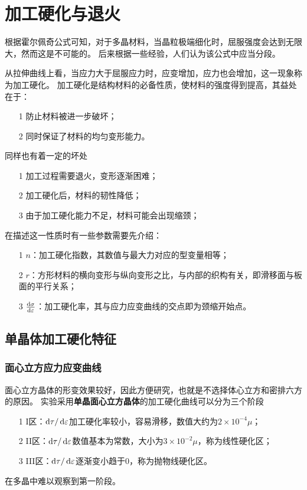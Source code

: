 \chapter{加工硬化与退火}
    根据霍尔佩奇公式可知，对于多晶材料，当晶粒极端细化时，屈服强度会达到无限大，然而这是不可能的。
    后来根据一些经验，人们认为该公式中应当分段。

    从拉伸曲线上看，当应力大于屈服应力时，应变增加，应力也会增加，这一现象称为加工硬化。
    加工硬化是结构材料的必备性质，使材料的强度得到提高，其益处在于：
    \begin{itemize}
        \item[1] 防止材料被进一步破坏；
        \item[2] 同时保证了材料的均匀变形能力。
    \end{itemize}
    同样也有着一定的坏处
    \begin{itemize}
        \item[1] 加工过程需要退火，变形逐渐困难；
        \item[2] 加工硬化后，材料的韧性降低；
        \item[3] 由于加工硬化能力不足，材料可能会出现缩颈；
    \end{itemize}
    在描述这一性质时有一些参数需要先介绍：
    \begin{itemize}
        \item[1] $n$：加工硬化指数，其数值与最大力对应的型变量相等；
        \item[2] $r$：方形材料的横向变形与纵向变形之比，与内部的织构有关，即滑移面与板面的平行关系；
        \item[3] $\frac{\mathop{}\!\mathrm{d} \sigma}{\mathop{}\!\mathrm{d} \varepsilon}$：加工硬化率，其与应力应变曲线的交点即为颈缩开始点。
    \end{itemize}
    \section{单晶体加工硬化特征}
        \subsection{面心立方应力应变曲线}
            面心立方晶体的形变效果较好，因此方便研究，也就是不选择体心立方和密排六方的原因。
            实验采用\textbf{单晶面心立方晶体}的加工硬化曲线可以分为三个阶段
            \begin{itemize}
                \item[1] I区：$\mathop{}\!\mathrm{d}\tau/\mathop{}\!\mathrm{d}\varepsilon$加工硬化率较小，容易滑移，数值大约为$2\times10^{-4}\mu$；
                \item[2] II区：$\mathop{}\!\mathrm{d}\tau/\mathop{}\!\mathrm{d}\varepsilon$数值基本为常数，大小为$3\times10^{-2}\mu$，称为线性硬化区；
                \item[3] III区：$\mathop{}\!\mathrm{d}\tau/\mathop{}\!\mathrm{d}\varepsilon$逐渐变小趋于0，称为抛物线硬化区。
            \end{itemize}
            在多晶中难以观察到第一阶段。

